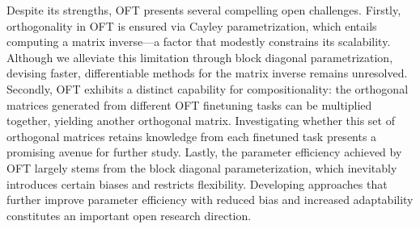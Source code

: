 Despite its strengths, OFT presents several compelling open challenges. Firstly, orthogonality in OFT is ensured via Cayley parametrization, which entails computing a matrix inverse—a factor that modestly constrains its scalability. Although we alleviate this limitation through block diagonal parametrization, devising faster, differentiable methods for the matrix inverse remains unresolved. Secondly, OFT exhibits a distinct capability for compositionality: the orthogonal matrices generated from different OFT finetuning tasks can be multiplied together, yielding another orthogonal matrix. Investigating whether this set of orthogonal matrices retains knowledge from each finetuned task presents a promising avenue for further study. Lastly, the parameter efficiency achieved by OFT largely stems from the block diagonal parameterization, which inevitably introduces certain biases and restricts flexibility. Developing approaches that further improve parameter efficiency with reduced bias and increased adaptability constitutes an important open research direction.

